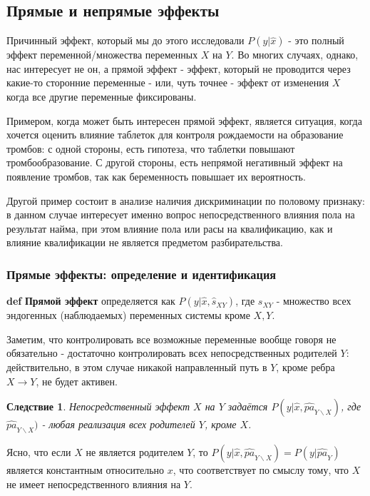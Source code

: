 \documentclass[fleqn]{article}
\def\define#1{\textbf{def} \textbf{#1}}
\newtheorem{corollary}{Следствие}
\numberwithin{equation}{section}
\numberwithin{theorem}{section}
\numberwithin{figure}{section}
\numberwithin{lemma}{section}
\numberwithin{corollary}{section}
\begin{document}
 \subsection*{Прямые и непрямые эффекты}
 
 Причинный эффект, который мы до этого исследовали $P(y|\hat x)$ - это полный эффект переменной/множества переменных $X$ на $Y$. Во многих случаях, однако, нас интересует не он, а прямой эффект - эффект, который не проводится через какие-то сторонние переменные - или, чуть точнее - эффект от изменения $X$ когда все другие переменные фиксированы. 
 
 Примером, когда может быть интересен прямой эффект, является ситуация,  когда хочется оценить влияние таблеток для контроля рождаемости на образование тромбов: с одной стороны, есть гипотеза, что таблетки повышают тромбообразование. С другой стороны, есть непрямой негативный эффект на появление тромбов, так как беременность повышает их вероятность. 
 
 Другой пример состоит в анализе наличия дискриминации по половому признаку: в данном случае интересует именно вопрос непосредственного влияния пола на результат найма, при этом влияние пола или расы на квалификацию, как и влияние квалификации не является предметом разбирательства.
 
  \subsubsection*{Прямые эффекты: определение и идентификация}
  
\define{Прямой эффект} определяется как $P(y|\hat x, \hat s_{XY})$, где $s_{XY}$ - множество всех эндогенных (наблюдаемых) переменных системы кроме $X,Y$. 

Заметим, что контролировать все возможные переменные вообще говоря не обязательно - достаточно контролировать всех непосредственных родителей $Y$: действительно, в этом случае никакой направленный путь в $Y$, кроме ребра $X \rightarrow Y$, не будет активен.

\begin{corollary}
	Непосредственный эффект $X$ на $Y$ задаётся $P(y|\hat x, \hat{pa}_{Y \backslash X})$, где $\hat{pa}_{Y \backslash X})$ - любая реализация всех родителей $Y$, кроме $X$.
\end{corollary}

Ясно, что если $X$ не является родителем $Y$, то $P(y|\hat x, \hat{pa}_{Y \backslash X}) = P(y|\hat{pa}_{Y})$ является константным относительно $x$, что соответствует по смыслу тому, что $X$ не имеет непосредственного влияния на $Y$. 
\end{document}
